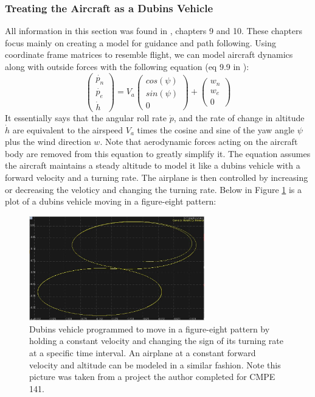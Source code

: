 \documentclass[12pt,journal,compsoc]{IEEEtran}
\begin{document}
\subsubsection{Treating the Aircraft as a Dubins Vehicle}
All information in this section was found in \cite{S-U-A}, chapters 9 and 10. These chapters focus mainly on creating a model for guidance and path following. Using coordinate frame matrices to resemble flight, we can model aircraft dynamics along with outside forces with the following equation (eq 9.9 in \cite{S-U-A}):
\[ \begin{pmatrix}
\dot{p_n} \\
\dot{p_e} \\
\dot{h}
\end{pmatrix}  
= V_a \begin{pmatrix}
cos(\psi) \\
sin(\psi) \\
0
\end{pmatrix}
+ \begin{pmatrix}
w_n \\
w_e \\
0
\end{pmatrix}
\]
It essentially says that the angular roll rate $\dot{p}$, and the rate of change in altitude $\dot{h}$ are equivalent to the airspeed $V_a$ times the cosine and sine of the yaw angle $\psi$ plus the wind direction $w$. Note that aerodynamic forces acting on the aircraft body are removed from this equation to greatly simplify it. The equation assumes the aircraft maintains a steady altitude to model it like a dubins vehicle with a forward velocity and a turning rate. The airplane is then controlled by increasing or decreasing the veloticy and changing the turning rate. Below in Figure \ref{f8} is a plot of a dubins vehicle moving in a figure-eight pattern:
\begin{figure}[h!]
\hspace*{0cm}
\centering
\includegraphics[width=3in]{dubins_fig8.jpg}
\caption{Dubins vehicle programmed to move in a figure-eight pattern by holding a constant velocity and changing the sign of its turning rate at a specific time interval. An airplane at a constant forward velocity and altitude can be modeled in a similar fashion. Note this picture was taken from a project the author completed for CMPE 141.}
\label{f8}
\end{figure}
\end{document}
